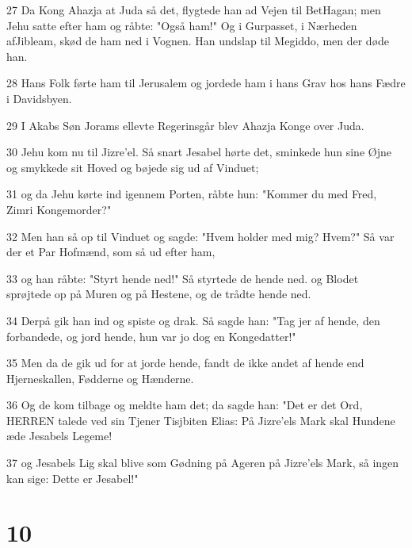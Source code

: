 \par 27 Da Kong Ahazja at Juda så det, flygtede han ad Vejen til BetHagan; men Jehu satte efter ham og råbte: "Også ham!" Og i Gurpasset, i Nærheden afJibleam, skød de ham ned i Vognen. Han undslap til Megiddo, men der døde han.
\par 28 Hans Folk førte ham til Jerusalem og jordede ham i hans Grav hos hans Fædre i Davidsbyen.
\par 29 I Akabs Søn Jorams ellevte Regerinsgår blev Ahazja Konge over Juda.
\par 30 Jehu kom nu til Jizre'el. Så snart Jesabel hørte det, sminkede hun sine Øjne og smykkede sit Hoved og bøjede sig ud af Vinduet;
\par 31 og da Jehu kørte ind igennem Porten, råbte hun: "Kommer du med Fred, Zimri Kongemorder?"
\par 32 Men han så op til Vinduet og sagde: "Hvem holder med mig? Hvem?" Så var der et Par Hofmænd, som så ud efter ham,
\par 33 og han råbte: "Styrt hende ned!" Så styrtede de hende ned. og Blodet sprøjtede op på Muren og på Hestene, og de trådte hende ned.
\par 34 Derpå gik han ind og spiste og drak. Så sagde han: "Tag jer af hende, den forbandede, og jord hende, hun var jo dog en Kongedatter!"
\par 35 Men da de gik ud for at jorde hende, fandt de ikke andet af hende end Hjerneskallen, Fødderne og Hænderne.
\par 36 Og de kom tilbage og meldte ham det; da sagde han: "Det er det Ord, HERREN talede ved sin Tjener Tisjbiten Elias: På Jizre'els Mark skal Hundene æde Jesabels Legeme!
\par 37 og Jesabels Lig skal blive som Gødning på Ageren på Jizre'els Mark, så ingen kan sige: Dette er Jesabel!"

\chapter{10}

